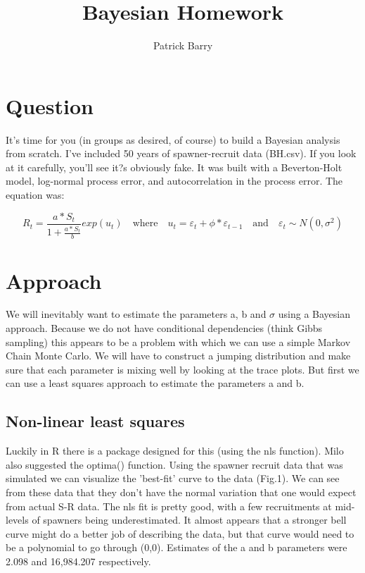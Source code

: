 \documentclass{article}
\begin{document}
\title{Bayesian Homework}
\author{Patrick Barry}

\maketitle

\section{Question}
It's time for you (in groups as desired, of course) to build a Bayesian analysis from scratch. I've included 50 years of spawner-recruit data (BH.csv). If you look at it carefully, you'll see it?s obviously fake. It was built with a Beverton-Holt model, log-normal process error, and autocorrelation in the process error. The equation was:

\begin{equation}
   R_t = \frac{a*S_t}{1+\frac{a*S_t}{b}}  exp(u_t)
   \quad\text{where}\quad
   u_t = \varepsilon_t + \phi*\varepsilon_{t-1}
   \quad\text{and}\quad
   \varepsilon_t \sim N(0,\sigma^2)
\end{equation}


\section{Approach}
We will inevitably want to estimate the parameters a, b and $\sigma$ using a Bayesian approach. Because we do not have conditional dependencies (think Gibbs sampling) this appears to be a problem with which we can use a simple Markov Chain Monte Carlo. We will have to construct a jumping distribution and make sure that each parameter is mixing well by looking at the trace plots. But first we can use a least squares approach to estimate the parameters a and b.

\subsection{Non-linear least squares}
Luckily in R there is a package designed for this (using the nls function). Milo also suggested the optima() function. Using the spawner recruit data that was simulated we can visualize the 'best-fit' curve to the data (Fig.1). We can see from these data that they don't have the normal variation that one would expect from actual S-R data. The nls fit is pretty good, with a few recruitments at mid-levels of spawners being underestimated. It almost appears that a stronger bell curve might do a better job of describing the data, but that curve would need to be a polynomial to go through (0,0). Estimates of the a and b parameters were 2.098 and 16,984.207 respectively. 
\end{document}
